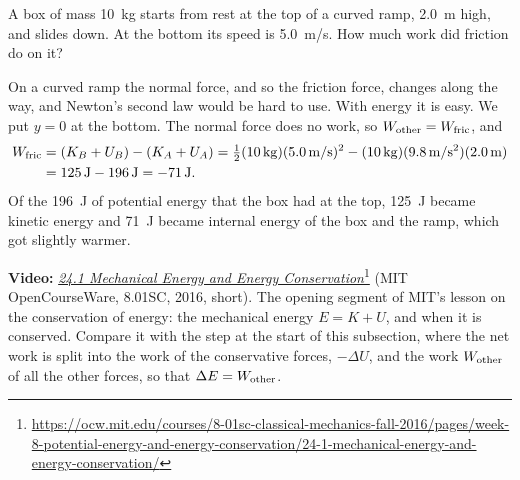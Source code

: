 \documentclass[11pt,a4paper]{article}
\begin{document}
\begin{example}
\setlength{\parskip}{0.5em plus 0.1em}%
A box of mass \qty{10}{kg} starts from rest at the top of a curved ramp, \qty{2.0}{m} high, and slides
down. At the bottom its speed is \qty{5.0}{m/s}. How much work did friction do on it?

On a curved ramp the normal force, and so the friction force, changes along the way, and Newton's
second law would be hard to use. With energy it is easy. We put $y = 0$ at the bottom. The normal
force does no work, so $W_{\mathrm{other}} = W_{\mathrm{fric}}$, and
\begin{align*}
  W_{\mathrm{fric}} &= (K_B + U_B) - (K_A + U_A)
  = \tfrac12(\qty{10}{kg})(\qty{5.0}{m/s})^2 - (\qty{10}{kg})(\qty{9.8}{m/s^2})(\qty{2.0}{m}) \\
  &= \qty{125}{J} - \qty{196}{J} = \qty{-71}{J} .
\end{align*}
Of the \qty{196}{J} of potential energy that the box had at the top, \qty{125}{J} became kinetic
energy and \qty{71}{J} became internal energy of the box and the ramp, which got slightly warmer.
\end{example}

\begin{aside}
\textbf{Video:}
\href{https://ocw.mit.edu/courses/8-01sc-classical-mechanics-fall-2016/pages/week-8-potential-energy-and-energy-conservation/24-1-mechanical-energy-and-energy-conservation/}{\emph{24.1
Mechanical Energy and Energy
Conservation}}\footnote{\raggedright\url{https://ocw.mit.edu/courses/8-01sc-classical-mechanics-fall-2016/pages/week-8-potential-energy-and-energy-conservation/24-1-mechanical-energy-and-energy-conservation/}}
(MIT OpenCourseWare, 8.01SC, 2016, short). The opening segment of MIT's lesson on the conservation
of energy: the mechanical energy $E = K + U$, and when it is conserved. Compare it with the step at
the start of this subsection, where the net work is split into the work of the conservative forces,
$-\Delta U$, and the work $W_{\mathrm{other}}$ of all the other forces, so that $\Delta E = W_{\mathrm{other}}$.
\end{aside}

\end{document}
